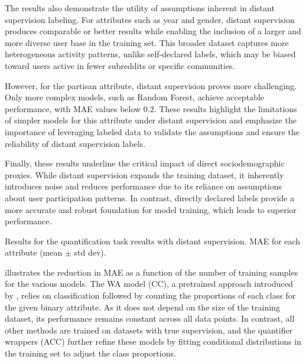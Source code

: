 The results also demonstrate the utility of assumptions inherent in distant supervision labeling.
For attributes such as year and gender, distant supervision produces comparable or better results while enabling the inclusion of a larger and more diverse user base in the training set.
This broader dataset captures more heterogeneous activity patterns, unlike self-declared labels, which may be biased toward users active in fewer subreddits or specific communities.

However, for the partisan attribute, distant supervision proves more challenging.
Only more complex models, such as Random Forest, achieve acceptable performance, with MAE values below $0.2$.
These results highlight the limitations of simpler models for this attribute under distant supervision and emphasize the importance of leveraging labeled data to validate the assumptions and ensure the reliability of distant supervision labels.

Finally, these results underline the critical impact of direct sociodemographic proxies.
While distant supervision expands the training dataset, it inherently introduces noise and reduces performance due to its reliance on assumptions about user participation patterns.
In contrast, directly declared labels provide a more accurate and robust foundation for model training, which leads to superior performance.

\begin{table}[t]
\caption{Results for the quantification task results with distant supervision. MAE for each attribute (mean $\pm$ std dev).}
\centering
\resizebox{\columnwidth}{!}{}
\label{table:quant-dist}
\end{table}

 illustrates the reduction in MAE as a function of the number of training samples for the various models.
The WA model (CC), a pretrained approach introduced by \citet{waller2021quantifying}, relies on classification followed by counting the proportions of each class for the given binary attribute.
As it does not depend on the size of the training dataset, its performance remains constant across all data points.
In contrast, all other methods are trained on datasets with true supervision, and the quantifier wrappers (ACC) further refine these models by fitting conditional distributions in the training set to adjust the class proportions.

